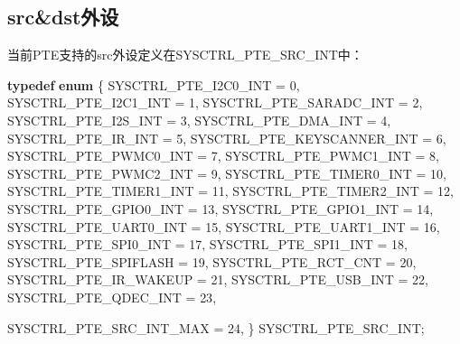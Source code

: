 \documentclass[
  12pt,
]{book}
\newenvironment{Shaded}{\begin{snugshade}}{\end{snugshade}}
\newcommand{\DecValTok}[1]{\textcolor[rgb]{0.00,0.00,0.81}{#1}}
\newcommand{\KeywordTok}[1]{\textcolor[rgb]{0.13,0.29,0.53}{\textbf{#1}}}
\newcommand{\NormalTok}[1]{#1}
\begin{document}
\hypertarget{srcdstux5916ux8bbe}{%
\subsection{src\&dst外设}\label{srcdstux5916ux8bbe}}

当前PTE支持的src外设定义在SYSCTRL\_PTE\_SRC\_INT中：

\begin{Shaded}
\begin{Highlighting}[]
\KeywordTok{typedef} \KeywordTok{enum}
\NormalTok{\{}
\NormalTok{    SYSCTRL_PTE_I2C0_INT       = }\DecValTok{0}\NormalTok{,}
\NormalTok{    SYSCTRL_PTE_I2C1_INT       = }\DecValTok{1}\NormalTok{,}
\NormalTok{    SYSCTRL_PTE_SARADC_INT     = }\DecValTok{2}\NormalTok{,}
\NormalTok{    SYSCTRL_PTE_I2S_INT        = }\DecValTok{3}\NormalTok{,}
\NormalTok{    SYSCTRL_PTE_DMA_INT        = }\DecValTok{4}\NormalTok{,}
\NormalTok{    SYSCTRL_PTE_IR_INT         = }\DecValTok{5}\NormalTok{,}
\NormalTok{    SYSCTRL_PTE_KEYSCANNER_INT = }\DecValTok{6}\NormalTok{,}
\NormalTok{    SYSCTRL_PTE_PWMC0_INT      = }\DecValTok{7}\NormalTok{,}
\NormalTok{    SYSCTRL_PTE_PWMC1_INT      = }\DecValTok{8}\NormalTok{,}
\NormalTok{    SYSCTRL_PTE_PWMC2_INT      = }\DecValTok{9}\NormalTok{,}
\NormalTok{    SYSCTRL_PTE_TIMER0_INT     = }\DecValTok{10}\NormalTok{,}
\NormalTok{    SYSCTRL_PTE_TIMER1_INT     = }\DecValTok{11}\NormalTok{,}
\NormalTok{    SYSCTRL_PTE_TIMER2_INT     = }\DecValTok{12}\NormalTok{,}
\NormalTok{    SYSCTRL_PTE_GPIO0_INT      = }\DecValTok{13}\NormalTok{,}
\NormalTok{    SYSCTRL_PTE_GPIO1_INT      = }\DecValTok{14}\NormalTok{,}
\NormalTok{    SYSCTRL_PTE_UART0_INT      = }\DecValTok{15}\NormalTok{,}
\NormalTok{    SYSCTRL_PTE_UART1_INT      = }\DecValTok{16}\NormalTok{,}
\NormalTok{    SYSCTRL_PTE_SPI0_INT       = }\DecValTok{17}\NormalTok{,}
\NormalTok{    SYSCTRL_PTE_SPI1_INT       = }\DecValTok{18}\NormalTok{,}
\NormalTok{    SYSCTRL_PTE_SPIFLASH       = }\DecValTok{19}\NormalTok{,}
\NormalTok{    SYSCTRL_PTE_RCT_CNT        = }\DecValTok{20}\NormalTok{,}
\NormalTok{    SYSCTRL_PTE_IR_WAKEUP      = }\DecValTok{21}\NormalTok{,}
\NormalTok{    SYSCTRL_PTE_USB_INT        = }\DecValTok{22}\NormalTok{,}
\NormalTok{    SYSCTRL_PTE_QDEC_INT       = }\DecValTok{23}\NormalTok{,}

\NormalTok{    SYSCTRL_PTE_SRC_INT_MAX    = }\DecValTok{24}\NormalTok{,}
\NormalTok{\} SYSCTRL_PTE_SRC_INT;}
\end{Highlighting}
\end{Shaded}
\end{document}
